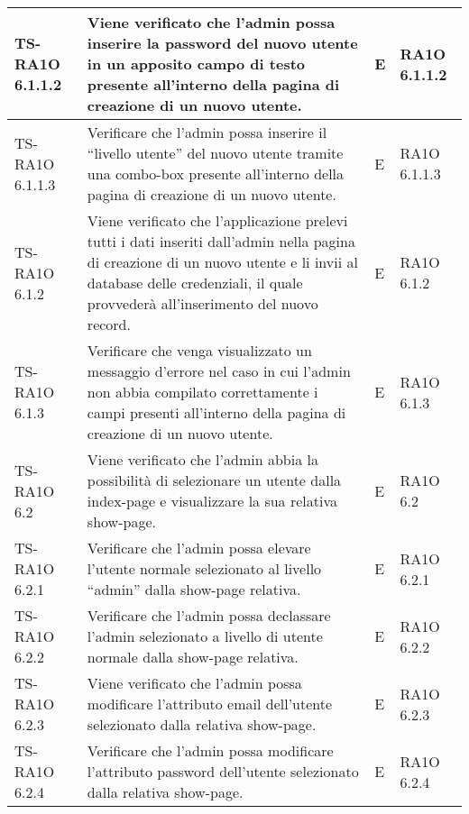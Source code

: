 \begin{center}
\begin{longtable}{| p{3cm} | p{6cm} | p{1.5cm} | p{2cm} | }
				TS-RA1O 6.1.1.2 & 
				Viene verificato che l'admin possa inserire la password del nuovo utente in un apposito campo di testo presente all'interno della pagina di creazione di un nuovo utente. & E & RA1O 6.1.1.2 \newline  \\ \hline 
				TS-RA1O 6.1.1.3 & 
				Verificare che l'admin possa inserire il ``livello utente'' del nuovo utente tramite una combo-box presente all'interno della pagina di creazione di un nuovo utente. & E & RA1O 6.1.1.3 \newline  \\ \hline 
				TS-RA1O 6.1.2 & 
				Viene verificato che l'applicazione prelevi tutti i dati inseriti dall'admin nella pagina di creazione di un nuovo utente e li invii al database delle credenziali, il quale provvederà all'inserimento del nuovo record. & E & RA1O 6.1.2 \newline  \\ \hline 
				TS-RA1O 6.1.3 & 
				Verificare che venga visualizzato un messaggio d'errore nel caso in cui l'admin non abbia compilato correttamente i campi presenti all'interno della pagina di creazione di un nuovo utente. & E & RA1O 6.1.3 \newline  \\ \hline 
				TS-RA1O 6.2 & 
				Viene verificato che l'admin abbia la possibilità di selezionare un utente dalla index-page e visualizzare la sua relativa show-page. & E & RA1O 6.2 \newline  \\ \hline 
				TS-RA1O 6.2.1 & 
				Verificare che l'admin possa elevare l'utente normale selezionato al livello ``admin'' dalla show-page relativa. & E & RA1O 6.2.1 \newline  \\ \hline 
				TS-RA1O 6.2.2 & 
				Verificare che l'admin possa declassare l'admin selezionato a livello di utente normale dalla show-page relativa. & E & RA1O 6.2.2 \newline  \\ \hline 
				TS-RA1O 6.2.3 & 
				Viene verificato che l'admin possa modificare l'attributo email dell'utente selezionato dalla relativa show-page. & E & RA1O 6.2.3 \newline  \\ \hline 
				TS-RA1O 6.2.4 & 
				Verificare che l'admin possa modificare l'attributo password dell'utente selezionato dalla relativa show-page. & E & RA1O 6.2.4 \newline  \\ \hline 

\end{longtable}
\end{center}
